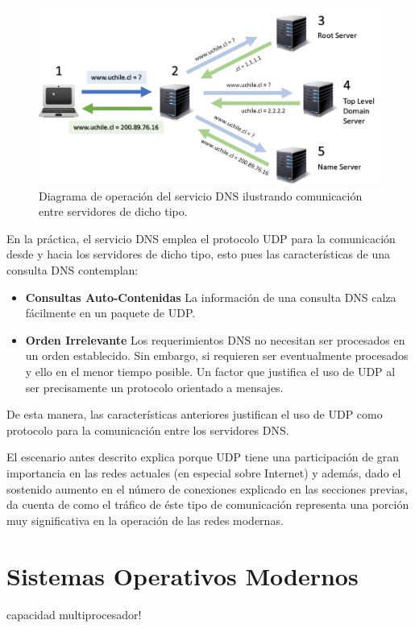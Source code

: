 \begin{figure}[!h]
	\centering
	\includegraphics[scale=0.7]{imagenes/dns-system}
	\caption{Diagrama de operación del servicio DNS ilustrando comunicación entre servidores de dicho tipo.}
	\label{fig:dns}
\end{figure}

En la práctica, el servicio DNS emplea el protocolo UDP para la comunicación desde y hacia los servidores de dicho tipo, esto pues las características de una consulta DNS contemplan:

\begin{itemize}
\item \textbf{Consultas Auto-Contenidas} La información de una consulta DNS calza fácilmente en un paquete de UDP.
\item \textbf{Orden Irrelevante} Los requerimientos DNS no necesitan ser procesados en un orden establecido. Sin embargo, si requieren ser eventualmente procesados y ello en el menor tiempo posible. Un factor que justifica el uso de UDP al ser precisamente un protocolo orientado a mensajes.
\end{itemize}

De esta manera, las características anteriores justifican el uso de UDP como protocolo para la comunicación entre los servidores DNS.

El escenario antes descrito explica porque UDP tiene una participación de gran importancia en las redes actuales (en especial sobre Internet) y además, dado el sostenido aumento en el número de conexiones explicado en las secciones previas, da cuenta de como el tráfico de éste tipo de comunicación representa una porción muy significativa en la operación de las redes modernas.

\section{Sistemas Operativos Modernos}
capacidad multiprocesador!

